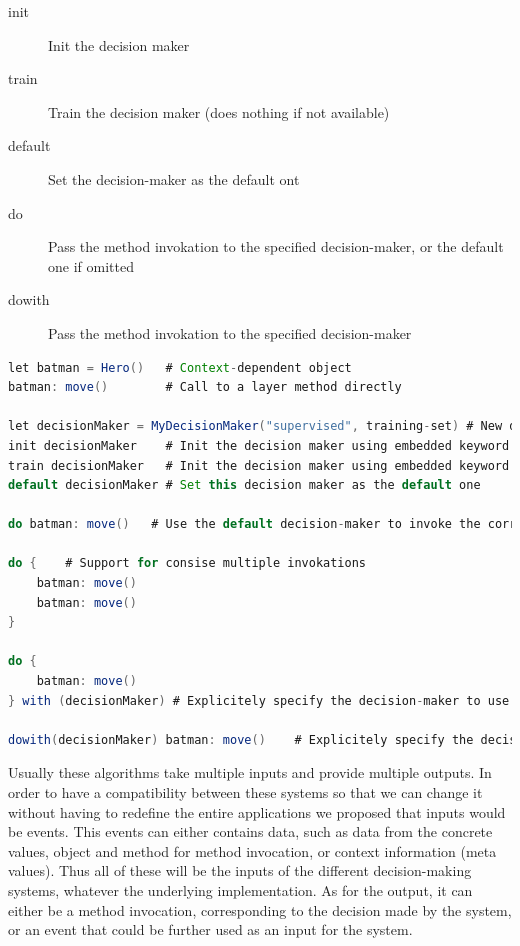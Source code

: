 \documentclass[a4paper]{article}
\begin{document}
\begin{description}
  \item[init] Init the decision maker
  \item[train] Train the decision maker (does nothing if not available)
  \item[default] Set the decision-maker as the default ont
  \item[do] Pass the method invokation to the specified decision-maker, or the default one if omitted
  \item[dowith] Pass the method invokation to the specified decision-maker
\end{description}

\begin{lstlisting}[float, language=Java, caption=ConGolo example, label={listing:congolohero}]
let batman = Hero()   # Context-dependent object
batman: move()        # Call to a layer method directly

let decisionMaker = MyDecisionMaker("supervised", training-set) # New decision maker
init decisionMaker    # Init the decision maker using embedded keyword
train decisionMaker   # Init the decision maker using embedded keyword
default decisionMaker # Set this decision maker as the default one

do batman: move()	# Use the default decision-maker to invoke the correct method move of Hero

do {	# Support for consise multiple invokations
	batman: move()
	batman: move()
}

do {
	batman: move()
} with (decisionMaker) # Explicitely specify the decision-maker to use

dowith(decisionMaker) batman: move()	# Explicitely specify the decision-maker to use in a consise form
\end{lstlisting}

Usually these algorithms take multiple inputs and provide multiple outputs. In order to have a compatibility between these systems so that we can change it without having to redefine the entire applications we proposed that inputs would be events. This events can either contains data, such as data from the concrete values, object and method for method invocation, or context information (meta values). Thus all of these will be the inputs of the different decision-making systems, whatever the underlying implementation. As for the output, it can either be a method invocation, corresponding to the decision made by the system, or an event that could be further used as an input for the system.
\end{document}
